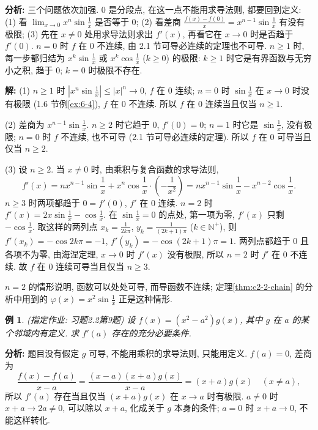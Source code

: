 \documentclass[UTF8,openany]{ctexbook}
\theoremstyle{chinesetextbook}
\newtheorem{example}{例}[section]
\newenvironment{cnsolution}{\par\indent\textbf{解:} \ignorespaces}{\par}
\begin{document}
\par\indent\textbf{分析:} 三个问题依次加强. $0$ 是分段点, 在这一点不能用求导法则, 都要回到定义: (1) 看 $\displaystyle\lim_{x\to0}x^n\sin\frac1x$ 是否等于 $0$; (2) 看差商 $\displaystyle\frac{f(x)-f(0)}x=x^{n-1}\sin\frac1x$ 有没有极限; (3) 先在 $x\ne0$ 处用求导法则求出 $f'(x)$, 再看它在 $x\to0$ 时是否趋于 $f'(0)$. $n=0$ 时 $f$ 在 $0$ 不连续, 由 2.1 节可导必连续的定理也不可导. $n\ge1$ 时, 每一步都归结为 $\displaystyle x^k\sin\frac1x$ 或 $\displaystyle x^k\cos\frac1x$ ($k\ge0$) 的极限: $k\ge1$ 时它是有界函数与无穷小之积, 趋于 $0$; $k=0$ 时极限不存在.
\begin{cnsolution}
(1) $n\ge1$ 时 $\displaystyle\left|x^n\sin\frac1x\right|\le|x|^n\to0$, $f$ 在 $0$ 连续; $n=0$ 时 $\displaystyle\sin\frac1x$ 在 $x\to0$ 时没有极限 (1.6 节例\ref{ex:6-4}), $f$ 在 $0$ 不连续. 所以 $f$ 在 $0$ 连续当且仅当 $n\ge1$.

(2) 差商为 $\displaystyle x^{n-1}\sin\frac1x$. $n\ge2$ 时它趋于 $0$, $f'(0)=0$; $n=1$ 时它是 $\displaystyle\sin\frac1x$, 没有极限; $n=0$ 时 $f$ 不连续, 也不可导 (2.1 节可导必连续的定理). 所以 $f$ 在 $0$ 可导当且仅当 $n\ge2$.

(3) 设 $n\ge2$. 当 $x\ne0$ 时, 由乘积与复合函数的求导法则,
\[
f'(x)=nx^{n-1}\sin\frac1x+x^n\cos\frac1x\cdot\left(-\frac1{x^2}\right)=nx^{n-1}\sin\frac1x-x^{n-2}\cos\frac1x.
\]
$n\ge3$ 时两项都趋于 $0=f'(0)$, $f'$ 在 $0$ 连续. $n=2$ 时 $\displaystyle f'(x)=2x\sin\frac1x-\cos\frac1x$. 在 $\displaystyle\sin\frac1x=0$ 的点处, 第一项为零, $f'(x)$ 只剩 $\displaystyle-\cos\frac1x$. 取这样的两列点 $\displaystyle x_k=\frac1{2k\pi}$, $\displaystyle y_k=\frac1{(2k+1)\pi}$ ($k\in\mathbb N^+$), 则 $f'(x_k)=-\cos2k\pi=-1$, $f'(y_k)=-\cos(2k+1)\pi=1$. 两列点都趋于 $0$ 且各项不为零, 由海涅定理, $x\to0$ 时 $f'(x)$ 没有极限, 所以 $n=2$ 时 $f'$ 在 $0$ 不连续. 故 $f$ 在 $0$ 连续可导当且仅当 $n\ge3$.
\end{cnsolution}
$n=2$ 的情形说明, 函数可以处处可导, 而导函数不连续; 定理\ref{thm:c2-2-chain} 的分析中用到的 $\displaystyle\varphi(x)=x^2\sin\frac1x$ 正是这种情形.
\begin{example}\label{ex:c2-h2-9}
\textnormal{(指定作业: 习题2.2第9题)} 设 $f(x)=(x^2-a^2)g(x)$, 其中 $g$ 在 $a$ 的某个邻域内有定义. 求 $f'(a)$ 存在的充分必要条件.
\end{example}
\par\indent\textbf{分析:} 题目没有假定 $g$ 可导, 不能用乘积的求导法则, 只能用定义. $f(a)=0$, 差商为
\[
\frac{f(x)-f(a)}{x-a}=\frac{(x-a)(x+a)g(x)}{x-a}=(x+a)g(x)\quad(x\ne a),
\]
所以 $f'(a)$ 存在当且仅当 $(x+a)g(x)$ 在 $x\to a$ 时有极限. $a\ne0$ 时 $x+a\to2a\ne0$, 可以除以 $x+a$, 化成关于 $g$ 本身的条件; $a=0$ 时 $x+a\to0$, 不能这样转化.
\end{document}
